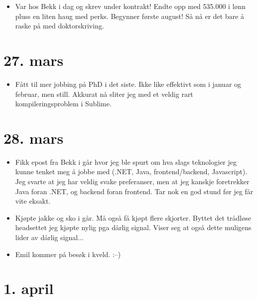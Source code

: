 \documentclass[11pt, norsk]{article}
\begin{document}
\begin{itemize}
  \item Var hos Bekk i dag og skrev under kontrakt! Endte opp med 535.000 i lønn pluss en liten haug med perks. Begynner første august! Så nå er det bare å raske på med doktorskriving.
\end{itemize}

\section{27. mars} %
\label{sec:27_mars}

\begin{itemize}
  \item Fått til mer jobbing på PhD i det siste. Ikke like effektivt som i januar og februar, men still. Akkurat nå sliter jeg med et veldig rart kompileringsproblem i Sublime.
\end{itemize}


\section{28. mars} %
\label{sec:28_mars}

\begin{itemize}
  \item Fikk epost fra Bekk i går hvor jeg ble spurt om hva slags teknologier jeg kunne tenket meg å jobbe med (.NET, Java, frontend/backend, Javascript). Jeg svarte at jeg har veldig svake preferanser, men at jeg kanskje foretrekker Java foran .NET, og backend foran frontend. Tar nok en god stund før jeg får vite eksakt.
  \item Kjøpte jakke og sko i går. Må også få kjøpt flere skjorter. Byttet det trådløse headsettet jeg kjøpte nylig pga dårlig signal. Viser seg at også dette muligens lider av dårlig signal...
  \item Emil kommer på besøk i kveld. :--)
\end{itemize}


\section{1. april} %
\label{sec:1_april}
\end{document}
